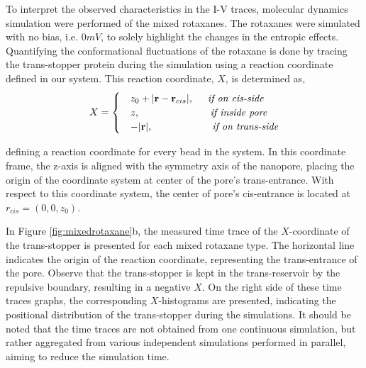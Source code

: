 To interpret the observed characteristics in the I-V traces, molecular dynamics
simulation were performed of the mixed rotaxanes. The rotaxanes were simulated with no
bias, i.e. $0 mV$, to solely highlight the changes in the entropic effects. Quantifying
the conformational fluctuations of the rotaxane is done by tracing the trans-stopper
protein during the simulation using a reaction coordinate defined in our system. This
reaction coordinate, $X$, is determined as,
\begin{equation}
  X = \begin{cases}
        &z_0 + |\textbf{r} - \textbf{r}_{cis}|, \hspace{0.5cm} \textit{if on cis-side}\\
        &z, \hspace{2.5cm} \textit{if inside pore}\\
        &-|\textbf{r}|, \hspace{2.11cm} \textit{if on trans-side}
      \end{cases}
      \label{eq:reaction}
\end{equation}

defining a reaction coordinate for every bead in the system. In this coordinate frame,
the z-axis is aligned with the symmetry axis of the nanopore, placing the origin of
the coordinate system at center of the pore's trans-entrance. With respect to this
coordinate system, the center of pore's cis-entrance is located at $r_{cis} = (0,0,z_0)$.


In Figure \ref{fig:mixedrotaxane}b, the measured time trace of the $X$-coordinate of the
trans-stopper is presented for each mixed rotaxane type.  The horizontal line indicates
the origin of the reaction coordinate, representing the trans-entrance of the pore.
Observe that the trans-stopper is kept in the trans-reservoir by the repulsive boundary,
resulting in a negative $X$. On the right side of these time traces graphs, the
corresponding $X$-histograms are presented, indicating the positional distribution of
the trans-stopper during the simulations. It should be noted that the time traces are not
obtained from one continuous simulation, but rather aggregated from various independent
simulations performed in parallel, aiming to reduce the simulation time.


